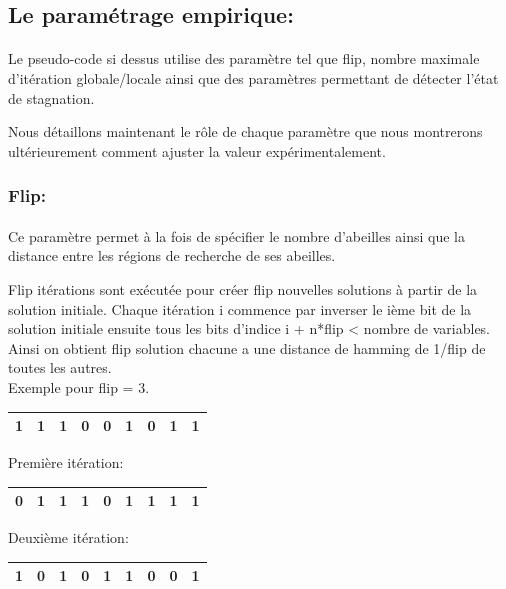 	\subsection{Le paramétrage empirique:}
	\paragraph{}
	Le pseudo-code si dessus utilise des paramètre tel que flip, nombre maximale d’itération globale/locale ainsi que des paramètres permettant de détecter l’état de stagnation.
	
	Nous détaillons maintenant le rôle de chaque paramètre que nous montrerons ultérieurement comment ajuster la valeur expérimentalement.
	\subsubsection{Flip:}
	\paragraph{}
	Ce paramètre permet à la fois de spécifier le nombre d’abeilles ainsi que la distance entre les régions de recherche de ses abeilles.

	Flip itérations sont exécutée pour créer flip nouvelles solutions à partir de la solution initiale. Chaque itération i commence par inverser le ième bit de la solution initiale ensuite tous les bits d’indice i + n*flip < nombre de variables. Ainsi on obtient flip solution chacune a une distance de hamming de 1/flip de toutes les autres.\\
	Exemple pour flip = 3.\\
	\begin{center}
		\begin{tabular}{| c| c| c| c| c| c| c| c| c|}
			\hline
			1& 1 & 1 & 0 & 0 & 1 & 0 & 1 & 1\\\hline
		\end{tabular}
	\end{center}
	Première itération:
	
	\begin{center}
		\begin{tabular}{| c| c| c| c| c| c| c| c| c|}
			\hline
			\cellcolor{green!60}0& 1 & 1 & \cellcolor{green!60}1 & 0 & 1 & \cellcolor{green!60}1 & 1 & 1\\\hline
		\end{tabular}
	\end{center}
	
	Deuxième itération:
	\begin{center}
		\begin{tabular}{| c| c| c| c| c| c| c| c| c|}
			\hline
			1& \cellcolor{green!60}0 & 1 & 0 &\cellcolor{green!60}1 & 1 & 0 &\cellcolor{green!60}0 & 1\\\hline
		\end{tabular}
	\end{center}
	
